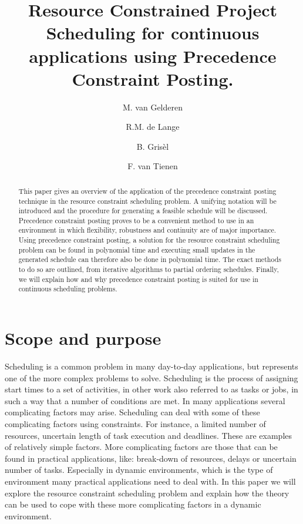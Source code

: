 \documentclass{article}
\title{Resource Constrained Project Scheduling for continuous applications using Precedence Constraint Posting.}
\author{M. van Gelderen  \and
    R.M. de Lange \and
    B. Gris\`el \and
    F. van Tienen}
\date{}
\begin{document}
\maketitle
\thispagestyle{empty}

\begin{abstract}
This paper gives an overview of the application of the precedence constraint posting technique in the resource constraint scheduling problem.
A unifying notation will be introduced and the procedure for generating a feasible schedule will be discussed. Precedence constraint posting proves to be a convenient method to use in an environment in which flexibility, robustness and continuity are of major importance.
Using precedence constraint posting, a solution for the resource constraint scheduling problem can be found in polynomial time and executing small updates in the generated schedule can therefore also be done in polynomial time.
The exact methods to do so are outlined, from iterative algorithms to partial ordering schedules. Finally, we will explain how and why precedence constraint posting is suited for use in continuous scheduling problems. 
\end{abstract}

\newpage

\section{Scope and purpose}
Scheduling is a common problem in many day-to-day applications, but represents one of the more complex problems to solve.
Scheduling is the process of assigning start times to a set of activities, in other work also referred to as tasks or jobs, in such a way that a number of conditions are met. 
In many applications several complicating factors may arise.
Scheduling can deal with some of these complicating factors using constraints.
For instance, a limited number of resources, uncertain length of task execution and deadlines.
These are examples of relatively simple factors. 
More complicating factors are those that can be found in practical applications, like: break-down of resources, delays or uncertain number of tasks.
Especially in dynamic environments, which is the type of environment many practical applications need to deal with.
In this paper we will explore the resource constraint scheduling problem and explain how the theory can be used to cope with these more complicating factors in a dynamic environment.
\end{document}
